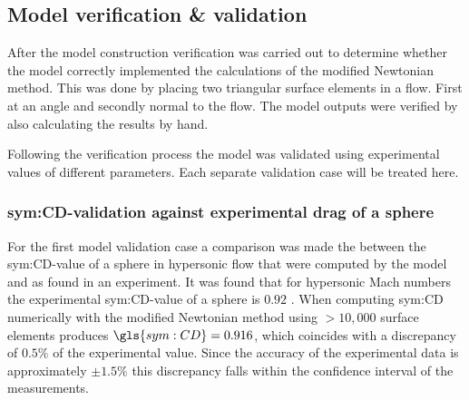 \subsection{Model verification \& validation}
\label{subsec:aeroverval}
After the model construction verification was carried out to determine whether the model correctly implemented the calculations of the modified Newtonian method. This was done by placing two triangular surface elements in a flow. First at an angle and secondly normal to the flow. The model outputs were verified by also calculating the results by hand.

Following the verification process the model was validated using experimental values of different parameters. Each separate validation case will be treated here.

\subsubsection{\gls{sym:CD}-validation against experimental drag of a sphere}
\label{subsubsec:valsphere}
For the first model validation case a comparison was made the between the \gls{sym:CD}-value of a sphere in hypersonic flow that were computed by the model and as found in an experiment. It was found that for hypersonic Mach numbers the experimental \gls{sym:CD}-value of a sphere is $0.92$ \cite{Bailey1966,AndersonJr.2007,Cox1965}. When computing \gls{sym:CD} numerically with the modified Newtonian method using $>10,000$ surface elements produces $\gls{sym:CD}=0.916$, which coincides with a discrepancy of $0.5\%$ of the experimental value. Since the accuracy of the experimental data is approximately $\pm1.5\%$ \cite{Bailey1966} this discrepancy falls within the confidence interval of the measurements.

